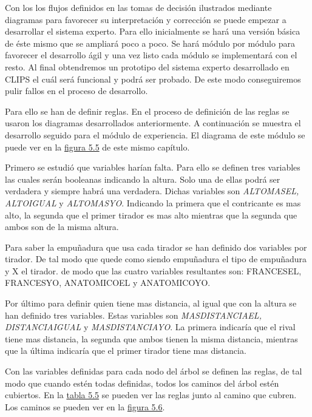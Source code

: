 Con los los flujos definidos en las tomas de decisión ilustrados mediante diagramas para favorecer
su interpretación y corrección se puede empezar a desarrollar el sistema experto. Para ello inicialmente
se hará una versión básica de éste mismo que se ampliará poco a poco. Se hará módulo por módulo
para favorecer el desarrollo ágil y una vez listo cada módulo se implementará con el resto.
Al final obtendremos un prototipo del sistema experto desarrollado en CLIPS el cuál será
funcional y podrá ser probado. De este modo conseguiremos pulir fallos en el proceso de desarrollo.

Para ello se han de definir reglas. En el proceso de definición de las reglas se usaron los
diagramas desarrollados anteriormente. A continuación se muestra el desarrollo seguido para el
módulo de experiencia. El diagrama de este módulo se puede ver en la \hyperref[fig:Arbol decisión experiencia]{figura 5.5} de este mismo capítulo.

Primero se estudió que variables harían falta. Para ello se definen tres variables las cuales serán booleanas
indicando la altura. Solo una de ellas podrá ser verdadera y siempre habrá una verdadera. Dichas variables son
\textit{ALTOMASEL, ALTOIGUAL} y \textit{ALTOMASYO}. Indicando la primera que el contricante es mas alto, la segunda
que el primer tirador es mas alto mientras que la segunda que ambos son de la misma altura.

Para saber la empuñadura que usa cada tirador se han definido dos variables por tirador. De tal modo que quede como
 siendo empuñadura el tipo de empuñadura y X el tirador. de modo que las cuatro variables
resultantes son: FRANCESEL, FRANCESYO, ANATOMICOEL y ANATOMICOYO.

Por último para definir quien tiene mas distancia, al igual que con la altura se han definido tres variables.
Estas variables son \textit{MASDISTANCIAEL, DISTANCIAIGUAL} y \textit{MASDISTANCIAYO}. La primera indicaría
que el rival tiene mas distancia, la segunda que ambos tienen la misma distancia, mientras que la última
indicaría que el primer tirador tiene mas distancia.

Con las variables definidas para cada nodo del árbol se definen las reglas, de tal modo que
cuando estén todas definidas, todos los caminos del árbol estén cubiertos. En la \hyperref[tab:Reglas distancia]{tabla 5.5} se pueden ver
las reglas junto al camino que cubren. Los caminos se pueden ver en la \hyperref[fig:Arbol decisión distancia con caminos numerados]{figura 5.6}.

